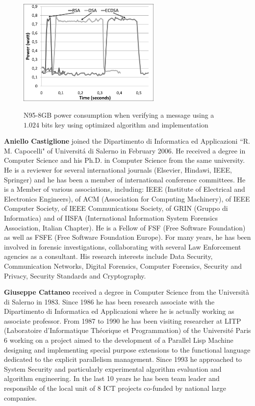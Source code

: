 \documentclass[authoryear]{elsarticle}
\begin{document}
\begin{figure}[h.q.]
\begin{center}
  \includegraphics[width=7cm]{immagini/N95PowerVerify_OPT.pdf}\\
  \caption{N95-8GB power consumption when verifying a message using a $1.024$ bits key using optimized algorithm and implementation}
  \label{fig:N95PowerVerify_OPT}
\end{center}
\end{figure}

%



\newpage

\textbf{Aniello Castiglione} joined the Dipartimento di Informatica ed Applicazioni ``R. M. Capocelli" of Universit\'{a} di Salerno in February 2006. He received a degree in Computer Science and his Ph.D. in Computer Science from the same university.
He is a reviewer for several international journals (Elsevier, Hindawi, IEEE, Springer) and he has been a member of international conference committees. He is a Member of various associations, including: IEEE (Institute of Electrical and Electronics Engineers), of ACM (Association for Computing Machinery), of IEEE Computer Society, of IEEE Communications Society, of GRIN (Gruppo di Informatica) and of  IISFA (International Information System Forensics Association, Italian Chapter). He is a Fellow of FSF (Free Software Foundation) as well as FSFE (Free Software Foundation Europe). For many years, he has been involved in forensic investigations, collaborating with several Law Enforcement agencies as a consultant. His research interests include Data Security, Communication Networks, Digital Forensics, Computer Forensics, Security and Privacy, Security Standards and Cryptography.

\medskip

\textbf{Giuseppe Cattaneo} received a degree in Computer Science from the Universit\`a di Salerno in 1983.
Since 1986 he has been research associate with the Dipartimento di Informatica ed Applicazioni
where he is actually working as associate professor. From 1987 to 1990 he has been visiting researcher at LITP (Laboratoire d'Informatique Th\'eorique et Programmation) of the  Universit\'e Paris 6 working on a project aimed to the development of a Parallel Lisp Machine designing and implementing special purpose extensions to the functional language dedicated to the explicit parallelism management. Since 1993 he approached to System Security and particularly experimental algorithm evaluation and algorithm engineering. In the last 10 years he has been team leader and responsible of the local unit of 8 ICT projects co-funded by national large companies.
\end{document}
